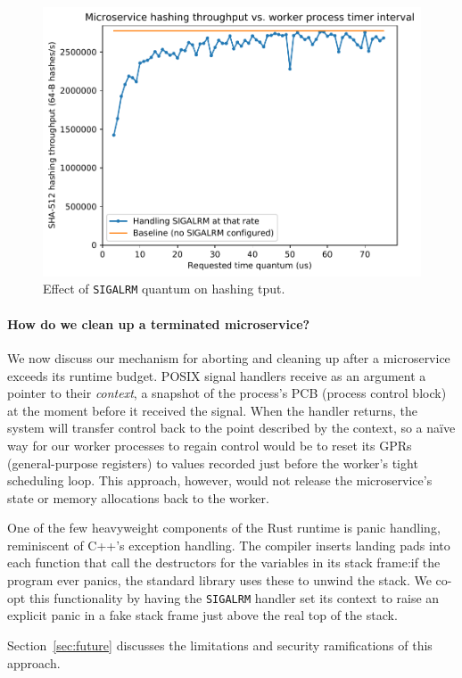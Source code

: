\begin{figure}
\includegraphics[width=\columnwidth]{figs/2018-02-02-evaluation_quantum-hasher_throughput-throughput}
\caption{Effect of \texttt{SIGALRM} quantum on hashing tput.}
\label{fig:hashtput}
\end{figure}

\paragraph{How do we clean up a terminated microservice?}
We now discuss our mechanism for aborting and cleaning up after a microservice
exceeds its runtime budget.  POSIX signal handlers receive as an argument a pointer to their
\textit{context}, a snapshot of the process's PCB (process control block) at the
moment before it received the signal.  When the handler returns, the system will
transfer control back to the point described by the context, so a naïve way for our
worker processes to regain control would be to reset its GPRs (general-purpose
registers) to values recorded just before the worker's tight scheduling loop.
This approach, however, would not release the microservice's state or memory
allocations back to the worker.

One of the few heavyweight components of the Rust runtime is panic handling,
reminiscent of C++'s exception handling.  The compiler inserts landing pads into each
function that call the destructors for the variables in its stack frame:\@ if the
program ever panics, the standard library uses these to unwind the stack.  We co-opt
this functionality by having the \texttt{SIGALRM} handler set its context to raise an
explicit panic in a fake stack frame just above the real top of the stack.

Section~\ref{sec:future} discusses the limitations and security ramifications of
this approach.

